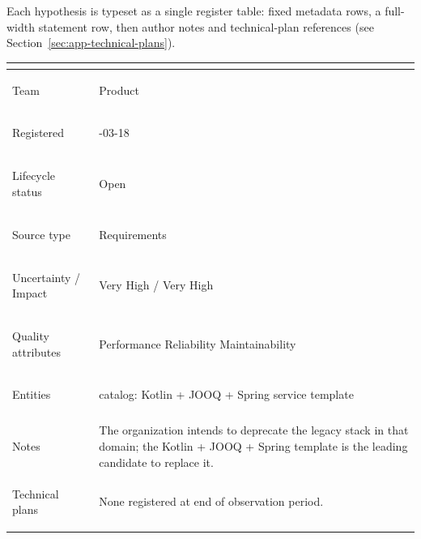 Each hypothesis is typeset as a single register table: fixed metadata rows, a
full-width statement row, then author notes and technical-plan references (see
Section~\ref{sec:app-technical-plans}).

\newcommand{\hypoboxnine}[9]{%
  \par\addvspace{0.55\baselineskip}%
  \noindent\begingroup
  \small
  \setlength{\tabcolsep}{6pt}%
  \begin{tabular}{@{} >{\bfseries\raggedright\arraybackslash}p{3.4cm} >{\raggedright\arraybackslash}p{\dimexpr\textwidth-3.4cm-6\tabcolsep} @{}}
  \toprule
  \multicolumn{2}{@{}l@{}}{\large #1} \\
  \midrule
  Team & #2 \\
  Registered & #3 \\
  Lifecycle status & #4 \\
  Source type & #5 \\
  Uncertainty / Impact & #8 \\
  Quality attributes & #7 \\
  Entities & {\begingroup\ttfamily\small #6\endgroup} \\
  \addlinespace
  \multicolumn{2}{@{}>{\raggedright\arraybackslash}p{\dimexpr\textwidth-4\tabcolsep}@{}}{%
    \textbf{Statement}\par\vspace{0.3\baselineskip}%
    ``#9''\par
  } \\
  \midrule
}
\newcommand{\hypoboxtail}[2]{%
  Notes & #1 \\
  Technical plans & #2 \\
  \bottomrule
  \end{tabular}%
  \endgroup
  \par
}

\hypoboxnine%
  {H01}%
  {Product}%
  {2026-03-18}%
  {Open}%
  {Requirements}%
  {catalog: Kotlin + JOOQ + Spring service template}%
  {Performance \textbar{} Reliability \textbar{} Maintainability}%
  {Very High / Very High}%
  {The Kotlin + JOOQ + Spring service template is ready to scale for use in
   regulated financial product services, replacing a legacy functional-language
   stack.}%
\hypoboxtail%
  {The organization intends to deprecate the legacy stack in that domain; the
   Kotlin + JOOQ + Spring template is the leading candidate to replace it.}%
  {None registered at end of observation period.}

